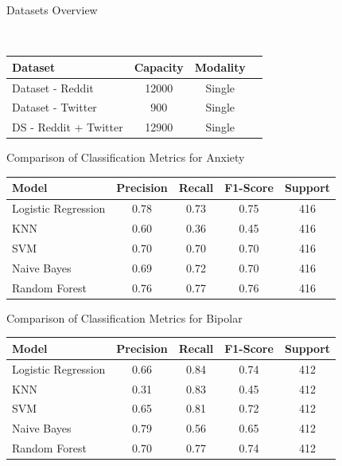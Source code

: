 \begin{center}
    \centering
    \caption{Datasets Overview} \\
    \vspace{0.05in}
    \begin{tabular}{|l|c|c|c|}
    \hline
    \textbf{Dataset} & \textbf{Capacity} & \textbf{Modality} \\ \hline
    Dataset - Reddit  & 12000              & Single            \\ \hline
    Dataset - Twitter  & 900                & Single            \\ \hline
    DS - Reddit + Twitter & 12900          & Single            \\ \hline
    \end{tabular}

    \vspace{0.25in}

\centering
\caption{Comparison of Classification Metrics for Anxiety}
\begin{tabular}{|l|c|c|c|c|}
\hline
\textbf{Model} & \textbf{Precision} & \textbf{Recall} & \textbf{F1-Score} & \textbf{Support} \\ \hline
Logistic Regression & 0.78 & 0.73 & 0.75 & 416 \\ \hline
KNN                & 0.60 & 0.36 & 0.45 & 416 \\ \hline
SVM                & 0.70 & 0.70 & 0.70 & 416 \\ \hline
Naive Bayes        & 0.69 & 0.72 & 0.70 & 416 \\ \hline
Random Forest      & 0.76 & 0.77 & 0.76 & 416 \\ \hline
\end{tabular}

\vspace{0.25in}

\centering
\caption{Comparison of Classification Metrics for Bipolar}
\begin{tabular}{|l|c|c|c|c|}
\hline
\textbf{Model} & \textbf{Precision} & \textbf{Recall} & \textbf{F1-Score} & \textbf{Support} \\ \hline
Logistic Regression & 0.66 & 0.84 & 0.74 & 412 \\ \hline
KNN                & 0.31 & 0.83 & 0.45 & 412 \\ \hline
SVM                & 0.65 & 0.81 & 0.72 & 412 \\ \hline
Naive Bayes        & 0.79 & 0.56 & 0.65 & 412 \\ \hline
Random Forest      & 0.70 & 0.77 & 0.74 & 412 \\ \hline
\end{tabular}


\end{center}
